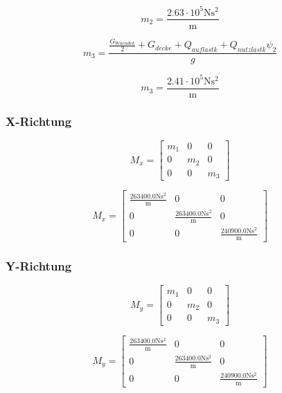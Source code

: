 \documentclass[
  letterpaper,
  DIV=11]{scrreprt}
\begin{document}
\begin{equation}m_{2} = \frac{2.63 \cdot 10^{5} \text{N} \text{s}^{2}}{\text{m}}\end{equation}

\begin{equation}m_{3} = \frac{\frac{G_{Waende k}}{2} + G_{decke} + Q_{auflast k} + Q_{nutzlast k} \psi_{2}}{g}\end{equation}

\begin{equation}m_{3} = \frac{2.41 \cdot 10^{5} \text{N} \text{s}^{2}}{\text{m}}\end{equation}

\hypertarget{x-richtung}{%
\subsubsection{X-Richtung}\label{x-richtung}}

\begin{equation}M_{x} = \left[\begin{matrix}m_{1} & 0 & 0\\0 & m_{2} & 0\\0 & 0 & m_{3}\end{matrix}\right]\end{equation}

\begin{equation}M_{x} = \left[\begin{matrix}\frac{263400.0 \text{N} \text{s}^{2}}{\text{m}} & 0 & 0\\0 & \frac{263400.0 \text{N} \text{s}^{2}}{\text{m}} & 0\\0 & 0 & \frac{240900.0 \text{N} \text{s}^{2}}{\text{m}}\end{matrix}\right]\end{equation}

\hypertarget{y-richtung}{%
\subsubsection{Y-Richtung}\label{y-richtung}}

\begin{equation}M_{y} = \left[\begin{matrix}m_{1} & 0 & 0\\0 & m_{2} & 0\\0 & 0 & m_{3}\end{matrix}\right]\end{equation}

\begin{equation}M_{y} = \left[\begin{matrix}\frac{263400.0 \text{N} \text{s}^{2}}{\text{m}} & 0 & 0\\0 & \frac{263400.0 \text{N} \text{s}^{2}}{\text{m}} & 0\\0 & 0 & \frac{240900.0 \text{N} \text{s}^{2}}{\text{m}}\end{matrix}\right]\end{equation}
\end{document}
